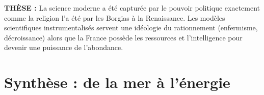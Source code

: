 \documentclass[a4paper,11pt]{article}
\begin{document}
\begin{titlepage}
\begin{tcolorbox}[colback=ChapColor!5, colframe=ChapColor, arc=3mm, boxrule=1pt, left=6mm, right=6mm, top=4mm, bottom=4mm]
\textbf{\color{ChapColor}TH\`{E}SE :} La science moderne a \'{e}t\'{e} captur\'{e}e par le pouvoir politique exactement comme la religion l'a \'{e}t\'{e} par les Borgias \`{a} la Renaissance. Les mod\`{e}les scientifiques instrumentalis\'{e}s servent une id\'{e}ologie du rationnement (enfermisme, d\'{e}croissance) alors que la France poss\`{e}de les ressources et l'intelligence pour devenir une puissance de l'abondance.
\end{tcolorbox}

\end{titlepage}

\section*{Synth\`{e}se : de la mer \`{a} l'\'{e}nergie}
\end{document}
